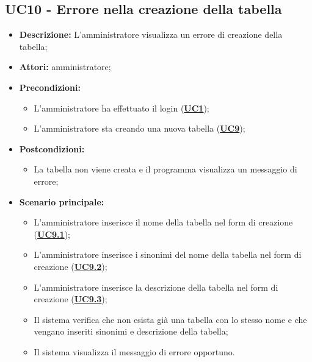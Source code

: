 \subsection{UC10 - Errore nella creazione della tabella}
\label{sec:UC10}
\begin{itemize}
	\item \textbf{Descrizione:} L’amministratore visualizza un errore di creazione della tabella;
	\item \textbf{Attori:} amministratore;
	\item \textbf{Precondizioni:} 
	\begin{itemize}
		\item L’amministratore ha effettuato il login (\hyperref[sec:UC1]{\textbf{UC1}});
		\item L’amministratore sta creando una nuova tabella (\hyperref[sec:UC9]{\textbf{UC9}});
	\end{itemize}
	\item \textbf{Postcondizioni:} 
	\begin{itemize}
		\item La tabella non viene creata e il programma visualizza un messaggio di errore;
	\end{itemize}
	\item \textbf{Scenario principale:} 
	\begin{itemize}
		\item L’amministratore inserisce il nome della tabella nel form di creazione (\hyperref[sec:UC9.1]{\textbf{UC9.1}});
		\item L’amministratore inserisce i sinonimi del nome della tabella nel form di creazione (\hyperref[sec:UC9.2]{\textbf{UC9.2}});
		\item L’amministratore inserisce la descrizione della tabella nel form di creazione (\hyperref[sec:UC9.3]{\textbf{UC9.3}});
		\item Il sistema verifica che non esista già una tabella con lo stesso nome e che vengano inseriti sinonimi e descrizione della tabella;
		\item Il sistema visualizza il messaggio di errore opportuno.
	\end{itemize}
\end{itemize}

